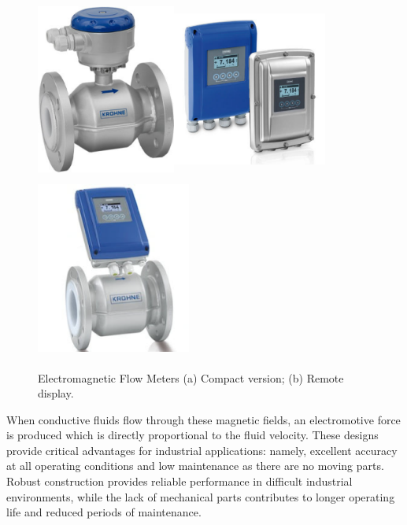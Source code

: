 \begin{figure}[h!]
    \centering
    \includegraphics[width=1.8in,height=2.31944in]{figs/flowmeters/image1.png}\includegraphics[width=2.0in,height=2.31944in]{figs/flowmeters/image2.png}\includegraphics[width=2.0in,height=2.31944in]{figs/flowmeters/image3.png}
    \caption{Electromagnetic Flow Meters (a) Compact version; (b) Remote display.}
    \label{fig:ElectricFlowMETERS}
\end{figure}

When conductive fluids flow through these magnetic fields, an electromotive force is produced which is directly proportional to the fluid velocity. These designs provide critical advantages for industrial applications: namely, excellent accuracy at all operating conditions and low maintenance as there are no moving parts. Robust construction provides reliable performance in difficult industrial environments, while the lack of mechanical parts contributes to longer operating life and reduced periods of maintenance.

